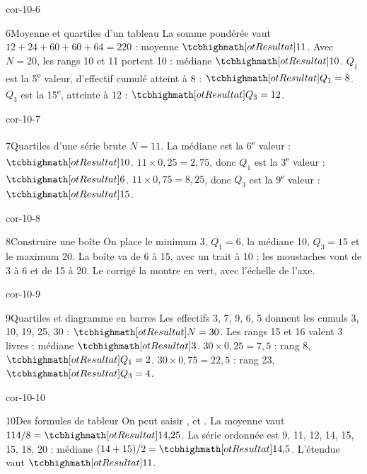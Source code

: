 \begin{blocLivre}{cor-10-6}\begin{corrige}{6}{Moyenne et quartiles d’un tableau}
La somme pondérée vaut $12+24+60+60+64=220$ : moyenne $\res{11}$. Avec $N=20$, les rangs 10 et 11 portent 10 : médiane $\res{10}$. $Q_1$ est la 5\textsuperscript{e} valeur, d’effectif cumulé atteint à 8 : $\res{Q_1=8}$. $Q_3$ est la 15\textsuperscript{e}, atteinte à 12 : $\res{Q_3=12}$.
\end{corrige}\end{blocLivre}
\begin{blocLivre}{cor-10-7}\begin{corrige}{7}{Quartiles d’une série brute}
$N=11$. La médiane est la 6\textsuperscript{e} valeur : $\res{10}$. $11\times0{,}25=2{,}75$, donc $Q_1$ est la 3\textsuperscript{e} valeur : $\res6$. $11\times0{,}75=8{,}25$, donc $Q_3$ est la 9\textsuperscript{e} valeur : $\res{15}$.
\end{corrige}\end{blocLivre}
\begin{blocLivre}{cor-10-8}\begin{corrige}{8}{Construire une boîte}
On place le minimum 3, $Q_1=6$, la médiane 10, $Q_3=15$ et le maximum 20. La boîte va de 6 à 15, avec un trait à 10 ; les moustaches vont de 3 à 6 et de 15 à 20. Le corrigé la montre en vert, avec l’échelle de l’axe.
\label{fig-cor-10-8}
\end{corrige}\end{blocLivre}
\begin{blocLivre}{cor-10-9}\begin{corrige}{9}{Quartiles et diagramme en barres}
Les effectifs 3, 7, 9, 6, 5 donnent les cumuls 3, 10, 19, 25, 30 : $\res{N=30}$. Les rangs 15 et 16 valent 3 livres : médiane $\res3$. $30\times0{,}25=7{,}5$ : rang 8, $\res{Q_1=2}$. $30\times0{,}75=22{,}5$ : rang 23, $\res{Q_3=4}$.
\label{fig-cor-10-9}
\end{corrige}\end{blocLivre}
\begin{blocLivre}{cor-10-10}\begin{corrige}{10}{Des formules de tableur}
On peut saisir ,  et . La moyenne vaut $114/8=\res{14{,}25}$. La série ordonnée est 9, 11, 12, 14, 15, 15, 18, 20 : médiane $(14+15)/2=\res{14{,}5}$. L’étendue vaut $\res{11}$.
\end{corrige}\end{blocLivre}
